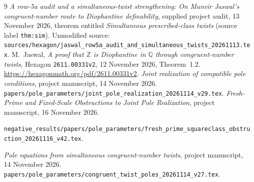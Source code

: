 \documentclass[11pt,a4paper]{article}
\theoremstyle{definition}\newtheorem{definition}[theorem]{Definition}
\theoremstyle{remark}\newtheorem{remark}[theorem]{Remark}
\newcommand{\Q}{\mathbb Q}\newcommand{\Z}{\mathbb Z}
\begin{document}
\begin{thebibliography}{9}
 \emph{A row-5a audit and a simultaneous-twist strengthening:
On Manvir Jaswal's congruent-number route to Diophantine definability},
supplied project audit, 13 November 2026, theorem entitled
\emph{Simultaneous prescribed-class twists} (source label
\texttt{thm:sim}). Unmodified source:
\nolinkurl{sources/hexagon/jaswal_row5a_audit_and_simultaneous_twists_20261113.tex}.
 M.~Jaswal, \emph{A proof that $\Z$ is Diophantine in $\Q$
through congruent-number twists}, Hexagon \texttt{2611.00331v2},
12 November 2026, Theorem~1.2.
\url{https://hexagonmath.org/pdf/2611.00331v2}.
 \emph{Joint realization of compatible pole conditions},
project manuscript, 14 November 2026.
\nolinkurl{papers/pole_parameters/joint_pole_realization_20261114_v29.tex}.
 \emph{Fresh-Prime and Fixed-Scale Obstructions to Joint Pole Realization},
project manuscript, 16 November 2026.
\par
{\raggedright
\nolinkurl{negative_results/papers/pole_parameters/fresh_prime_squareclass_obstruction_20261116_v42.tex}.\par}
 \emph{Pole equations from simultaneous congruent-number twists},
project manuscript, 14 November 2026.
\nolinkurl{papers/pole_parameters/congruent_twist_poles_20261114_v27.tex}.
\end{thebibliography}
\end{document}

